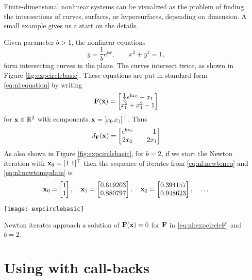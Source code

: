 Finite-dimensional nonlinear systems can be visualized as the problem of finding the intersections of curves, surfaces, or hypersurfaces, depending on dimension.  A small example gives us a start on the details.

\clearpage
\noindent\hrulefill
\begin{example}  Given parameter $b > 1$, the nonlinear equations
    $$y = \frac{1}{b} e^{bx}, \qquad x^2+y^2 = 1,$$
form intersecting curves in the plane.  The curves intersect twice, as shown in Figure \ref{fig:expcirclebasic}.  These equations are put in standard form \eqref{eq:nl:equation} by writing
\begin{equation}
\label{eq:nl:expcircleF}
\mathbf{F}(\mathbf{x}) = \begin{bmatrix}
           \frac{1}{b} e^{b x_0} - x_1 \\
           x_0^2 + x_1^2 - 1
           \end{bmatrix}
\end{equation}
for $\mathbf{x}\in \mathbb{R}^2$ with components $\mathbf{x} = [x_0 \, x_1]^\top$.  Thus
\begin{equation}
\label{eq:nl:ecjacobian}
J_{\mathbf{F}}(\mathbf{x}) = \begin{bmatrix}
    e^{b x_0} & & -1 \\
    2 x_0   & & 2 x_1 \end{bmatrix}
\end{equation}
As also shown in Figure \ref{fig:expcirclebasic}, for $b=2$, if we start the Newton iteration with $\mathbf{x}_0 = [1 \,\, 1]^\top$ then the sequence of iterates from \eqref{eq:nl:newtoneq} and \eqref{eq:nl:newtonupdate} is
    $${\mathbf{x}}_{0} = \begin{bmatrix} 1 \\ 1 \end{bmatrix}, \quad {\mathbf{x}}_{1} = \begin{bmatrix} 0.619203 \\ 0.880797 \end{bmatrix}, \quad {\mathbf{x}}_{2} = \begin{bmatrix} 0.394157 \\ 0.948623 \end{bmatrix}, \quad \dots$$

\begin{marginfigure}
\texttt{[image: expcirclebasic]}
\caption{Newton iterates approach a solution of $\mathbf{F}(\mathbf{x})=0$ for $\mathbf{F}$ in \eqref{eq:nl:expcircleF} and $b=2$.}
\label{fig:expcirclebasic}
\end{marginfigure}

\noindent\hrulefill
\end{example}


\section{Using \pSNES with call-backs} \label{sec:usingsnes}

